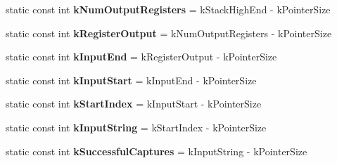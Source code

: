 \begin{DoxyCompactItemize}
\item 
static const int {\bfseries k\+Num\+Output\+Registers} = k\+Stack\+High\+End -\/ k\+Pointer\+Size\hypertarget{classv8_1_1internal_1_1_reg_exp_macro_assembler_p_p_c_a7c3a5603898d75fd79ef9dbfdf0376b0}{}\label{classv8_1_1internal_1_1_reg_exp_macro_assembler_p_p_c_a7c3a5603898d75fd79ef9dbfdf0376b0}

\item 
static const int {\bfseries k\+Register\+Output} = k\+Num\+Output\+Registers -\/ k\+Pointer\+Size\hypertarget{classv8_1_1internal_1_1_reg_exp_macro_assembler_p_p_c_a33538515a7de4584fb90343ab2f60615}{}\label{classv8_1_1internal_1_1_reg_exp_macro_assembler_p_p_c_a33538515a7de4584fb90343ab2f60615}

\item 
static const int {\bfseries k\+Input\+End} = k\+Register\+Output -\/ k\+Pointer\+Size\hypertarget{classv8_1_1internal_1_1_reg_exp_macro_assembler_p_p_c_a0dee3e0863e9138451ca4b7d5bb110d1}{}\label{classv8_1_1internal_1_1_reg_exp_macro_assembler_p_p_c_a0dee3e0863e9138451ca4b7d5bb110d1}

\item 
static const int {\bfseries k\+Input\+Start} = k\+Input\+End -\/ k\+Pointer\+Size\hypertarget{classv8_1_1internal_1_1_reg_exp_macro_assembler_p_p_c_a203c41758f336494d1dceb3abcecb7f5}{}\label{classv8_1_1internal_1_1_reg_exp_macro_assembler_p_p_c_a203c41758f336494d1dceb3abcecb7f5}

\item 
static const int {\bfseries k\+Start\+Index} = k\+Input\+Start -\/ k\+Pointer\+Size\hypertarget{classv8_1_1internal_1_1_reg_exp_macro_assembler_p_p_c_a26495e6df820ed1701bce48d2dedf744}{}\label{classv8_1_1internal_1_1_reg_exp_macro_assembler_p_p_c_a26495e6df820ed1701bce48d2dedf744}

\item 
static const int {\bfseries k\+Input\+String} = k\+Start\+Index -\/ k\+Pointer\+Size\hypertarget{classv8_1_1internal_1_1_reg_exp_macro_assembler_p_p_c_a893ef1f11eba335372dec8aacfc2bc12}{}\label{classv8_1_1internal_1_1_reg_exp_macro_assembler_p_p_c_a893ef1f11eba335372dec8aacfc2bc12}

\item 
static const int {\bfseries k\+Successful\+Captures} = k\+Input\+String -\/ k\+Pointer\+Size\hypertarget{classv8_1_1internal_1_1_reg_exp_macro_assembler_p_p_c_aadb2682d98d4121fd6c9541739f18645}{}\label{classv8_1_1internal_1_1_reg_exp_macro_assembler_p_p_c_aadb2682d98d4121fd6c9541739f18645}


\end{DoxyCompactItemize}
